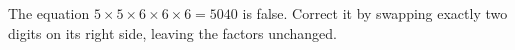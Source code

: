The equation $5\times5\times6\times6\times6=5040$ is false. Correct it by swapping exactly two digits on its right side, leaving the factors unchanged.
